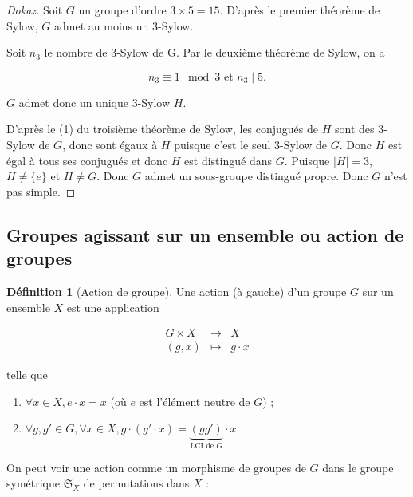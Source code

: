 \documentclass[french]{book}
\theoremstyle{definition}
\newtheorem{protodefinition}{Définition}[section]
\newenvironment{definition}
    {\colorlet{shadecolor}{green!5}\begin{shaded}\begin{protodefinition}}
    {\end{protodefinition}\end{shaded}}
\theoremstyle{remark}
\begin{document}
\begin{proof}[Dokaz]
  Soit $G$ un groupe d'ordre $3 \times 5 = 15$. D'après le premier théorème de Sylow, $G$ admet au moins un 3-Sylow.

  Soit $n_3$ le nombre de 3-Sylow de G. Par le deuxième théorème de Sylow, on a

  \[
  n_3 \equiv 1 \mod 3 \text{ et } n_3 \mid 5.
  \]

  $G$ admet donc un unique 3-Sylow $H$.

  D'après le (1) du troisième théorème de Sylow, les conjugués de $H$ sont des 3-Sylow de $G$, donc sont égaux à $H$ puisque c'est le seul 3-Sylow de $G$. Donc $H$ est égal à tous ses conjugués et donc $H$ est distingué dans $G$. Puisque $\lvert H \rvert = 3$, $H \neq \{ e \} $ et $H \neq G$. Donc $G$ admet un sous-groupe distingué propre. Donc $G$ n'est pas simple.
\end{proof}

\subsection{Groupes agissant sur un ensemble ou action de groupes}

\begin{definition}[Action de groupe]
  Une action (à gauche) d'un groupe $G$ sur un ensemble $X$ est une application

  \[
  \begin{matrix}
  G  \times X& \longrightarrow & X \\
  (g,x) & \longmapsto & g \cdot x
  \end{matrix}
  \]

  telle que

  \begin{enumerate}
    \item $\forall x \in X, e \cdot x = x$ (où $e$ est l'élément neutre de $G$) ;
    \item $\forall g, g' \in G, \forall x \in X, g \cdot (g' \cdot x) = \underbrace{(gg')}_{\text{LCI de } G}\cdot x$.
  \end{enumerate}
\end{definition}

On peut voir une action comme un morphisme de groupes de $G$ dans le groupe symétrique $\mathfrak{S}_{X} $ de permutations dans $X$ :
\end{document}
